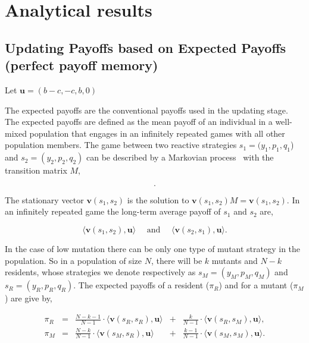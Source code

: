 \documentclass[11pt]{article}
\theoremstyle{plainCl1}
\theoremstyle{plainCl2}
\begin{document}
\newpage


\section{Analytical results}
\label{section:analyticalresults}


\subsection{Updating Payoffs based on Expected Payoffs (perfect payoff memory)}\label{section:perfect_memory}

Let \(\mathbf{u} = (b-c, -c, b, 0)\)

The expected payoffs are the conventional payoffs used in the updating stage.
The expected payoffs are defined as the mean payoff of an individual in a well-mixed population that
engages in an infinitely repeated games with all other population members.
The game between two reactive strategies $s_1\!=\!(y_1, p_1, q_1$) and $s_2\!=\!(y_2,p_2,q_2)$
can be described by a Markovian process~\cite{nowak:APC:1989} with the
transition matrix \(M\),

\begin{equation}\label{eq:transition_matrix}
  .
\end{equation}

The stationary vector \(\mathbf{v}(s_1,s_2)\) is the solution to
\(\mathbf{v}(s_1,s_2) M = \mathbf{v}(s_1,s_2)\). In an infinitely repeated game
the long-term average payoff of \(s_1\) and \(s_2\) are,

\[\langle\mathbf{v}(s_1,s_2),\mathbf{u}\rangle \quad  \text{ and } \quad  \langle\mathbf{v}(s_2,s_1), \mathbf{u}\rangle.\]

In the case of low mutation there can be only one type of mutant strategy in the
population. So in a population of size \(N\), there will be \(k\) mutants and
\(N - k\) residents, whose strategies we denote respectively as \(s_M =(y_M,
p_M, q_M)\) and \(s_R = (y_R, p_R, q_R)\).
The expected payoffs of a resident (\(\pi_R\)) and for a
mutant (\(\pi_M\)) are give by,

\begin{equation} \label{Eq:ExpPay}
  \begin{array}{lcrcr}
  \displaystyle \pi_R & = &\displaystyle \frac{N\!-\!k\!-\!1}{N-1}\cdot \langle\mathbf{v}(s_R,s_R),\mathbf{u}\rangle	&+	&\displaystyle\frac{k}{N-1}\cdot \langle\mathbf{v}(s_R,s_M),\mathbf{u}\rangle,\\[0.5cm]
  \displaystyle \pi_M & = &\displaystyle\frac{N-k}{N-1}\cdot \langle\mathbf{v}(s_M,s_R),\mathbf{u}\rangle&+	&\displaystyle\frac{k-1}{N-1}\cdot \langle\mathbf{v}(s_M,s_M),\mathbf{u}\rangle.\\
  \end{array}
\end{equation}
\end{document}
